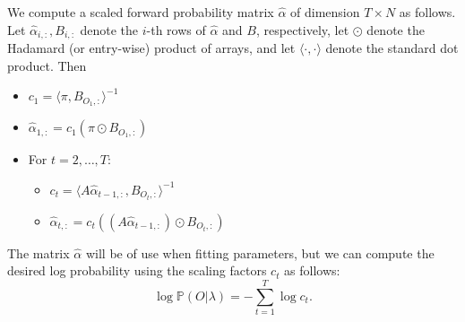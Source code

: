 \begin{comment}
We define the \emph{forward probabilities} $\alpha_{t,i}$ to be the joint probability of the partial observation sequence up through time $t$ and the event that the system is in state $i$ at time $t$, conditioned on the model parameters $\lambda$, i.e.
\begin{equation*}
\alpha_{t,i} = \mathbb{P}(O_{1},\cdots,O_{t},\mathbf{x}_{t} = i | \lambda)
\end{equation*}
The forward probabilities $\alpha_{t,i}$ can be computed recursively as follows:
\begin{itemize}
 \item $\alpha_{1,i} = \pi_{i}b_{O_{1},i}$
 \item $\alpha_{t,i} = \left[ \sum_{j=1}^{N} \alpha_{t-1,j}a_{i,j}\right] b_{O_{t},i}$ for $t = 2,\cdots,T.$
\end{itemize}
We can represent these forward probabilities in a single $T\times N$ matrix $\alpha$.
Unfortunately, this is subject to serious underflow issues, since we are repeatedly multiplying together numbers between $0$ and $1$. 
\end{comment}

We compute a scaled forward probability matrix $\widehat{\alpha}$ of dimension $T \times N$ as follows. 
Let $\widehat{\alpha}_{i,:}, B_{i,:}$ denote the $i$-th rows of $\widehat{\alpha}$ and $B$, respectively, let $\odot$ denote the Hadamard (or entry-wise) product of arrays,
and let $\langle \cdot, \cdot \rangle$ denote the standard dot product.
Then
\begin{itemize}
 \item $c_1 = \langle \pi, B_{O_1,:}\rangle^{-1}$
 \item $\widehat{\alpha}_{1,:} = c_1(\pi\odot B_{O_1,:})$
 \item For $t = 2, \ldots, T$:
 \begin{itemize}[]
     \item $c_t = \langle A\widehat{\alpha}_{t-1,:}, B_{O_t,:}\rangle^{-1}$
	 \item $\widehat{\alpha}_{t,:} = c_t((A\widehat{\alpha}_{t-1,:})\odot B_{O_t,:})$
 \end{itemize}
\end{itemize}
The matrix $\widehat{\alpha}$ will be of use when fitting parameters, but we can compute the desired log probability using the scaling factors $c_t$ as follows:
\[
\log \mathbb{P}(O | \lambda) = -\sum_{t=1}^T \log c_t.
\]

